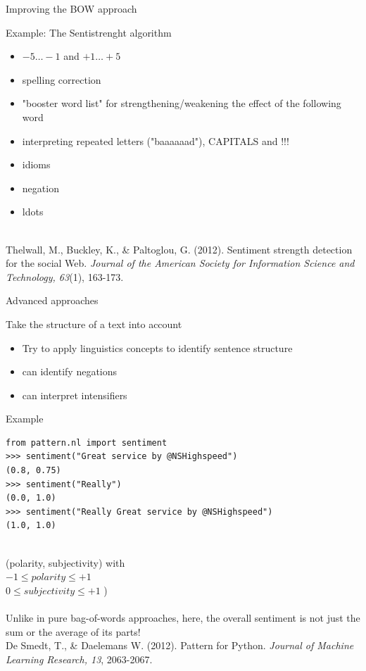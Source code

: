 \documentclass{beamer}
\begin{document}
\begin{frame}{Improving the BOW approach}
	\begin{block}{Example: The Sentistrenght algorithm}
		\begin{itemize}
			\item $-5\ldots-1$ and $+1\ldots+5$
			\item spelling correction
			\item "booster word list" for strengthening/weakening the effect of the following word
			\item interpreting repeated letters ("baaaaaad"), CAPITALS and !!!
			\item idioms
			\item negation 
			\item ldots
		\end{itemize}
	\end{block}
	~ \\
	\tiny{Thelwall, M., Buckley, K., \& Paltoglou, G. (2012). Sentiment strength detection for the social Web. \emph{Journal of the American Society for Information Science and Technology, 63}(1), 163-173.\\}
\end{frame}


\begin{frame}{Advanced approaches}
	\begin{block}{Take the structure of a text into account}
		\begin{itemize}
			\item Try to apply linguistics concepts to identify sentence structure
			\item can identify negations
			\item can interpret intensifiers
		\end{itemize}
	\end{block}
\end{frame}


\begin{frame}[fragile]{Example}
\begin{lstlisting}
from pattern.nl import sentiment
>>> sentiment("Great service by @NSHighspeed")
(0.8, 0.75)
>>> sentiment("Really")
(0.0, 1.0)
>>> sentiment("Really Great service by @NSHighspeed")
(1.0, 1.0)
\end{lstlisting}
~\\
\footnotesize{(polarity, subjectivity) with \\
	$-1 \leq polarity \leq +1$\\
	$0 \leq subjectivity \leq +1$ )\\} ~ \\
Unlike in pure bag-of-words approaches, here, the overall sentiment is not just the sum or the average of its parts! \\
\tiny{De Smedt, T., \& Daelemans W. (2012).  Pattern for Python. \emph{Journal of Machine Learning Research, 13}, 2063-2067.}
\end{frame}
\end{document}
